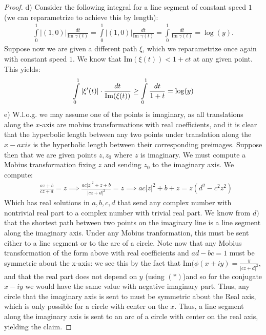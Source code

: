 \documentclass{article}
\begin{document}
\begin{proof}
     d) Consider the following integral for a line segment of constant speed $1$(we can reparametrize to achieve this by length):
     \begin{align*}
       \int\limits_{0}^{1} |(1,0)| \frac{dt}{\text{Im } \gamma(t)} = \int\limits_{0}^{1} |(1,0)| \frac{dt}{\text{Im } \gamma(t)}  = \int\limits_{0}^{1} \frac{dt}{\text{Im } \gamma(t)} = \log(y).
     \end{align*}
     Suppose now we are given a different path $\xi$, which we reparametrize once again with constant speed $1$. We know that $\text{Im} (\xi(t)) < 1 + ct$ at any given point. This yields:
     \begin{align*}
       \int\limits_{0}^{1}| \xi'(t) | \cdot \frac{dt}{\text{Im} (\xi(t))} \geq \int\limits_{0}^{1}\frac{dt}{\text1+ t} = \log(y)  
     \end{align*} \newpage
     e) W.l.o.g. we may assume one of the points is imaginary, as all translations along the $x$-axis are mobius transformations with real coefficients, and it is clear that the hyperbolic length between any two points under translation along the $x-axis$ is the hyperbolic length between their corresponding preimages. Suppose then that we are given points $z, z_{0}$ where $z$ is imaginary. We must compute a Mobius transformation fixing $z$ and sending $z_{0}$ to the imaginary axis. We compute:
     \begin{align*}
       & \frac{az + b}{cz+d} = z \implies \frac{ac|z|^{2}+ z +b }{|cz + d|^{2}} = z \implies ac|z|^{2} + b + z = z(d^{2}-c^{2}z^{2}) 
     \end{align*}
     Which has real solutions in $a,b,c,d$ that send any complex number with nontrivial real part to a complex number with trivial real part. We know from $d)$ that the shortest path between two points on the imaginary line is a line segment along the imaginary axis. Under any Mobius tranformation, this must be sent either to a line segment or to the arc of a circle. Note now that any Mobius transformation of the form above with real coefficients and $ad-bc =1$ must be symmetric about the x-axis: we see this by the fact that $\text{Im}(\phi(x + iy) = \frac{y}{|cz + d|^{2}}$, and that the real part does not depend on $y$ (using $(*)$)and so for the conjugate $x - iy$ we would have the same value with negative imaginary part. Thus, any circle that the imaginary axis is sent to must be symmetric about the Real axis, which is only possible for a circle with center on the $x$. Thus, a line segment along the imaginary axis is sent to an arc of a circle with center on the real axis, yielding the claim.
   \end{proof}
\end{document}
